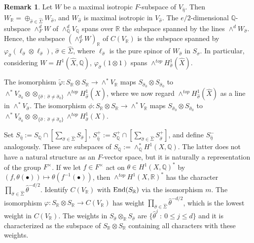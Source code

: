 \documentclass[12pt]{amsart}
\numberwithin{equation}{subsection}
\theoremstyle{plain}
\theoremstyle{definition}
\newtheorem{rem}[thm]{Remark}
\newcommand{\QQ}{{\mathbb Q}}
\newcommand{\RR}{{\mathbb R}}
\newcommand{\End}{{\rm End}}
\begin{document}
{\begin{rem}
Let $W$ be a maximal isotropic $F$-subspace of $V_{\hat{\eta}}$. Then $W_\RR=\oplus_{\hat{\sigma}\in\hat{\Sigma}}W_{\hat{\sigma}}$, and 
$W_{\hat{\sigma}}$ is maximal isotropic in $V_{\hat{\sigma}}$. The $e/2$-dimensional $\QQ$-subspace $\wedge^d_FW$ of $\wedge^d_\QQ V_\QQ$ spans over $\RR$ the subspace
spanned by the lines $\wedge^dW_{\hat{\sigma}}$. Hence, the subspace $(\wedge^d_FW)_\RR$ of $C(V_\RR)$ is 
the subspace spanned by $\varphi_{\hat{\sigma}}(\ell_{\hat{\sigma}}\otimes \ell_{\hat{\sigma}})$, $\hat{\sigma}\in\hat{\Sigma}$, where $\ell_{\hat{\sigma}}$ is the pure spinor of $W_{\hat{\sigma}}$ in $S_{\hat{\sigma}}$. In particular, considering $W=H^1(\hat{X},\QQ)$,
$\varphi_{\hat{\sigma}}(1\otimes 1)$ spans $\wedge^{top}H^1_{\hat{\sigma}}(\hat{X})$.
\end{rem}

The isomorphism $\tilde{\varphi}:S_\RR\otimes S_\RR\rightarrow \wedge^*V_\RR$ maps $S_{\hat{\sigma}_0}\otimes S_{\hat{\sigma}_0}$ to 
$\wedge^*V_{\hat{\sigma}_0}\otimes\otimes_{\{ \hat{\sigma} \ : \ \hat{\sigma}\neq\hat{\sigma}_0\}}\wedge^{top}H^1_{\hat{\sigma}}(\hat{X})$, where we now regard $\wedge^{top}H^1_{\hat{\sigma}}(\hat{X})$ as a line in $\wedge^*V_{\hat{\sigma}}$. The isomorphism $\phi:S_\RR\otimes S_\RR\rightarrow \wedge^*V_\RR$ maps $S_{\hat{\sigma}_0}\otimes S_{\hat{\sigma}_0}$ to 
$\wedge^*V_{\hat{\sigma}_0}\otimes\otimes_{\{ \hat{\sigma} \ : \ \hat{\sigma}\neq\hat{\sigma}_0\}}\wedge^{top}H^1_{\hat{\sigma}}(X)$. 


Set $S_{\hat{\eta}}:=S_\QQ\cap[\sum_{\hat{\sigma}\in\hat{\Sigma}}S_{\hat{\sigma}}]$, $S^+_{\hat{\eta}}:=S^+_\QQ\cap[\sum_{\hat{\sigma}\in\hat{\Sigma}}S^+_{\hat{\sigma}}]$, and define $S^-_{\hat{\eta}}$ analogously. These are subspaces of $S_\QQ:=\wedge^*_\QQ H^1(X,\QQ)$. The latter does not have a natural structure as an $F$-vector space, but it is naturally a representation of the  group $F^\times$. 
If we let $f\in F^\times$ act on $\theta\in H^1(X,\QQ)^*$ by  $(f,\theta(\bullet))\mapsto \theta(f^{-1}(\bullet))$, then $\wedge^{top}H^1(X,\RR)^*$ has the character $\prod_{\hat{\sigma}\in\hat{\Sigma}}\hat{\theta}^{-d/2}$. Identify $C(V_\RR)$ with $\End(S_\RR)$ via the isomorphism $m$.
The isomorphism $\varphi:S_\RR\otimes S_\RR\rightarrow C(V_\RR)$ has weight $\prod_{\hat{\sigma}\in\hat{\Sigma}}\hat{\theta}^{-d/2}$, which is the lowest weight in $C(V_\RR)$. The weights in $S_{\hat{\sigma}}\otimes_\RR S_{\hat{\sigma}}$ are 
$\{\hat{\theta}^j \ : \ 0\leq j \leq d\}$ and it is characterized as the subspace of $S_\RR\otimes S_\RR$ containing all characters with these weights.

}
\end{document}
